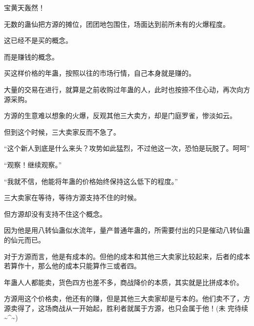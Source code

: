 \begin{this_body}
宝黄天轰然！

无数的蛊仙把方源的摊位，团团地包围住，场面达到前所未有的火爆程度。

这已经不是买的概念。

而是赚钱的概念。

买这样价格的年蛊，按照以往的市场行情，自己本身就是赚的。

大量的交易在进行，就算是之前收购过年蛊的人，此时也按捺不住心动，再次向方源采购。

方源的生意难以想象的火爆，反观其他三大卖方，却是门庭罗雀，惨淡如云。

但到这个时候，三大卖家反而不急了。

“这个新人到底是什么来头？攻势如此猛烈，不过他这一次，恐怕是玩脱了。呵呵”

“观察！继续观察。”

“我就不信，他能将年蛊的价格始终保持这么低下的程度。”

三大卖家在等待，等待方源支持不住的时候。

但方源却没有支持不住这个概念。

因为他是用八转仙蛊似水流年，量产普通年蛊的，所需要付出的只是催动八转仙蛊的仙元而已。

对于方源而言，他是有成本的。但他的成本和其他三大卖家比较起来，后者的成本若算作十，那么他的成本只能算作三或者四。

年蛊人人都能卖，货色四方也差不多，商战降价的本质，其实就是比拼成本价。

方源用这个价格卖，他还有的赚，但是其他三大卖家却是亏本的。他们卖不了，方源卖得了，这场商战从一开始起，胜利者就属于方源，也只会属于他！(未 完待续 \~{}\^{}\~{})

\end{this_body}

